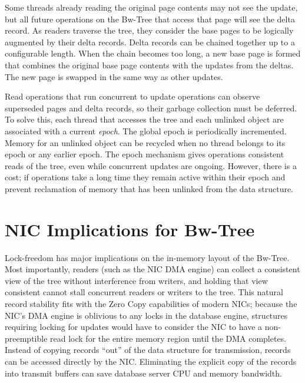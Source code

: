 Some threads already reading the original page contents may not see
the update, but all future operations on the Bw-Tree that access that page
will see the delta record. As readers traverse the tree, they consider
the base pages to be logically augmented by their delta records. Delta records
can be chained together up to a configurable length.  When the chain becomes
too long, a new base page is formed that combines the original base page
contents with the updates from the deltas. The new page is swapped in
the same way as other updates.

Read operations that run concurrent to update operations can observe superseded
pages and delta records, so their garbage collection must be deferred.
To solve this, each thread that
accesses the tree and each unlinked object are associated with a current {\em epoch}.
The global epoch is periodically incremented. Memory for an unlinked object can be
recycled when no thread belongs to its epoch or any earlier epoch.
The epoch mechanism gives operations consistent reads of the
tree, even while concurrent updates are ongoing. However, there is a
cost; if operations take a long time they remain active within their epoch and
prevent reclamation of memory that has been unlinked from the data structure.


\section{NIC Implications for Bw-Tree}
Lock-freedom has major implications on the in-memory layout of the
Bw-Tree. Most importantly, readers (such as the NIC DMA engine) can collect a
consistent view of the tree without interference from writers, and holding that
view consistent cannot stall concurrent readers or writers to the tree.  This
natural record stability fits with the Zero Copy capabilities of modern NICs;
because the NIC's DMA engine is oblivious to any locks in the database engine,
structures requiring locking for updates would have to consider the NIC to
have a non-preemptible read lock for the entire memory region until the DMA completes.
Instead of copying records ``out'' of the data structure for transmission,
records can be accessed directly by the NIC. Eliminating the explicit copy of
the records into transmit buffers can save database server CPU and memory
bandwidth.


